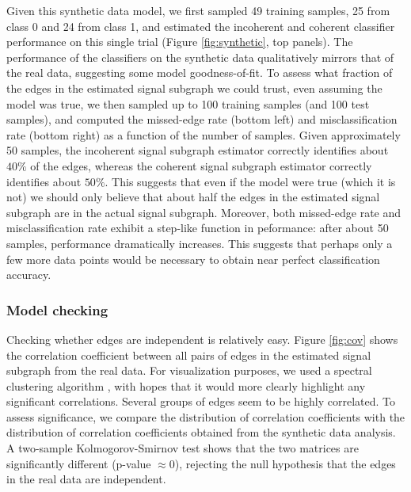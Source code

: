\documentclass[10pt,journal,cspaper,compsoc]{IEEEtran}
\begin{document}
Given this synthetic data model, we first sampled 49 training samples, 25 from class 0 and 24 from class 1, and estimated the incoherent and coherent classifier performance on this single trial (Figure \ref{fig:synthetic}, top panels).  The performance of the classifiers on the synthetic data qualitatively mirrors that of the real data, suggesting some model goodness-of-fit.  To assess what fraction of the edges in the estimated signal subgraph we could trust, even assuming the model was true, we then sampled up to 100 training samples (and 100 test samples), and computed the missed-edge rate (bottom left) and misclassification rate (bottom right) as a function of the number of samples.  Given approximately 50 samples, the incoherent signal subgraph estimator correctly identifies about $40\%$ of the edges, whereas the coherent signal subgraph estimator correctly identifies about $50\%$.  This suggests that even if the model were true (which it is not) we should only believe that about half the edges in the estimated signal subgraph are in the actual signal subgraph.  Moreover, both missed-edge rate and misclassification rate exhibit a step-like function in peformance: after about 50 samples, performance dramatically increases.  This suggests that perhaps only a few more data points would be necessary to obtain near perfect classification accuracy.  


\subsubsection{Model checking} %
\label{ssub:model_checking}


Checking whether edges are independent is relatively easy.  Figure \ref{fig:cov} shows the correlation coefficient between all pairs of edges in the estimated signal subgraph from the real data.  For visualization purposes, we used a spectral clustering algorithm \cite{Dhillon2001}, with hopes that it would more clearly highlight any significant correlations.  Several groups of edges seem to be highly  correlated.  To assess significance, we compare the distribution of correlation coefficients with the distribution of correlation coefficients obtained from the synthetic data analysis.  A two-sample Kolmogorov-Smirnov test shows that the two matrices are significantly different (p-value $\approx 0$), rejecting the null hypothesis that the edges in the real data are independent. 
\end{document}
